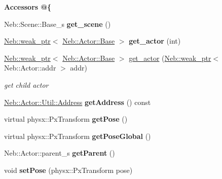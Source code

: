 \begin{Indent}{\bf \-Accessors @\{}\par
\begin{DoxyCompactItemize}
\item 
\hypertarget{classNeb_1_1Actor_1_1Base_a3b637c94cb35ed3f665132b3f7943daf}{\-Neb\-::\-Scene\-::\-Base\-\_\-s {\bfseries get\-\_\-scene} ()}\label{classNeb_1_1Actor_1_1Base_a3b637c94cb35ed3f665132b3f7943daf}

\item 
\hypertarget{classNeb_1_1Actor_1_1Base_a982f7f74294bc574613ac6d656cae708}{\hyperlink{classNeb_1_1weak__ptr}{\-Neb\-::weak\-\_\-ptr}$<$ \hyperlink{classNeb_1_1Actor_1_1Base}{\-Neb\-::\-Actor\-::\-Base} $>$ {\bfseries get\-\_\-actor} (int)}\label{classNeb_1_1Actor_1_1Base_a982f7f74294bc574613ac6d656cae708}

\item 
\hyperlink{classNeb_1_1weak__ptr}{\-Neb\-::weak\-\_\-ptr}$<$ \hyperlink{classNeb_1_1Actor_1_1Base}{\-Neb\-::\-Actor\-::\-Base} $>$ \hyperlink{classNeb_1_1Actor_1_1Base_ad5acc8ec9b76f0d49050bf6b50823508}{get\-\_\-actor} (\hyperlink{classNeb_1_1weak__ptr}{\-Neb\-::weak\-\_\-ptr}$<$ \-Neb\-::\-Actor\-::addr $>$ addr)
\begin{DoxyCompactList}\small\item\em get child actor \end{DoxyCompactList}\item 
\hypertarget{classNeb_1_1Actor_1_1Base_a3125fb49728707613266d4818df328cf}{\hyperlink{classNeb_1_1Actor_1_1Util_1_1Address}{\-Neb\-::\-Actor\-::\-Util\-::\-Address} {\bfseries get\-Address} () const }\label{classNeb_1_1Actor_1_1Base_a3125fb49728707613266d4818df328cf}

\item 
\hypertarget{classNeb_1_1Actor_1_1Base_aac89b4475a9443894c9814472702adcb}{virtual physx\-::\-Px\-Transform {\bfseries get\-Pose} ()}\label{classNeb_1_1Actor_1_1Base_aac89b4475a9443894c9814472702adcb}

\item 
\hypertarget{classNeb_1_1Actor_1_1Base_a76f34261b14ea648f42da355138efc9b}{virtual physx\-::\-Px\-Transform {\bfseries get\-Pose\-Global} ()}\label{classNeb_1_1Actor_1_1Base_a76f34261b14ea648f42da355138efc9b}

\item 
\hypertarget{classNeb_1_1Actor_1_1Base_a7c43fa0fe2512d34aa5836d994ca99dd}{\-Neb\-::\-Actor\-::parent\-\_\-s {\bfseries get\-Parent} ()}\label{classNeb_1_1Actor_1_1Base_a7c43fa0fe2512d34aa5836d994ca99dd}

\item 
\hypertarget{classNeb_1_1Actor_1_1Base_a98dd3ef316b4d28c5f36efa2d1e73966}{void {\bfseries set\-Pose} (physx\-::\-Px\-Transform pose)}\label{classNeb_1_1Actor_1_1Base_a98dd3ef316b4d28c5f36efa2d1e73966}

\end{DoxyCompactItemize}
\end{Indent}
